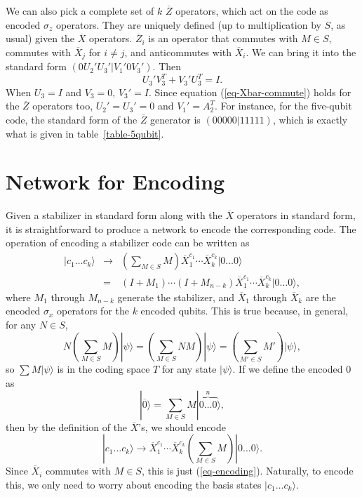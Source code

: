 \documentclass{report}
\newcommand{\ket}[1]{|{#1}\rangle}
\newcommand{\X}{\sigma_x}
\newcommand{\Z}{\sigma_z}
\newcommand{\Xbar}{\overline{X}}
\newcommand{\Zbar}{\overline{Z}}
\newcommand{\Sum}{\sum}
\begin{document}
We can also pick a complete set of $k$ $\Zbar$ operators, which act on the 
code as encoded $\Z$ operators.  They are uniquely defined (up to 
multiplication by $S$, as usual) given the $\Xbar$ operators.  $\Zbar_i$ is 
an operator that commutes with $M \in S$, commutes with $\Xbar_j$ for $i 
\neq j$, and anticommutes with $\Xbar_i$.  We can bring it into the 
standard form $(0 U_2' U_3' | V_1' 0 V_3')$.  Then
\begin{equation}
U_3' V_3^T + V_3' U_3^T = I.
\end{equation}
When $U_3 = I$ and $V_3 = 0$, $V_3' = I$.  Since equation 
(\ref{eq-Xbar-commute}) holds for the $\Zbar$ operators too, $U_2' = U_3' 
= 0$ and $V_1' = A_2^T$.  For instance, for the five-qubit code, the standard 
form of the $\Zbar$ generator is $(0 0 0 0 0 | 1 1 1 1 1)$, which is exactly 
what is given in table~\ref{table-5qubit}.

\section{Network for Encoding}
\label{sec-encode-network}

Given a stabilizer in standard form along with the $\Xbar$ operators in 
standard form, it is straightforward to produce a network to encode the 
corresponding code.  The operation of encoding a stabilizer code can be 
written as
\begin{eqnarray}
\ket{c_1 \ldots c_k} & \rightarrow & \left( \Sum_{M \in S} M \right) 
\Xbar_1^{c_1} \cdots \Xbar_k^{c_k} \ket{0 \ldots 0} \label{eq-encoding}\\
& = & (I + M_1) \cdots (I + M_{n-k}) \Xbar_1^{c_1} \cdots \Xbar_k^{c_k} 
\ket{0\ldots 0}, \label{eq-encoding2}
\end{eqnarray}
where $M_1$ through $M_{n-k}$ generate the stabilizer, and $\Xbar_1$ 
through $\Xbar_k$ are the encoded $\X$ operators for the $k$ encoded 
qubits.  This is true because, in general, for any $N \in S$,
\begin{equation}
N \left( \Sum_{M \in S} M \right) \ket{\psi} = \left( \Sum_{M \in S} NM 
\right) \ket{\psi} = \left( \Sum_{M' \in S} M' \right) \ket{\psi},
\end{equation}
so $\Sum M \ket{\psi}$ is in the coding space $T$ for any state 
$\ket{\psi}$.  If we define the encoded $0$ as
\begin{equation}
\ket{\overline{0}} = \Sum_{M \in S} M \ket{\overbrace{0 \ldots 0}^{n}},
\end{equation}
then by the definition of the $\Xbar$'s, we should encode
\begin{equation}
\ket{c_1 \ldots c_k} \rightarrow \Xbar_1^{c_1} \cdots \Xbar_k^{c_k} \left( 
\Sum_{M \in S} M \right)  \ket{0 \ldots 0}.
\end{equation}
Since $\Xbar_i$ commutes with $M \in S$, this is just (\ref{eq-encoding}).  
Naturally, to encode this, we only need to worry about encoding the basis 
states $\ket{c_1 \ldots c_k}$.
\end{document}
